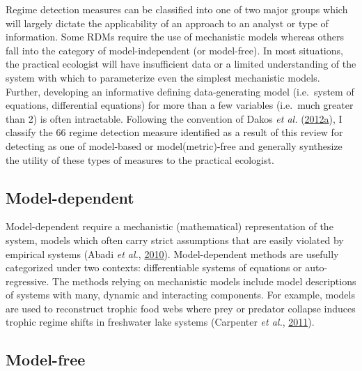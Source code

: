 \documentclass[12pt,twoside,openany]{reedthesis}
\begin{document}
Regime detection measures can be classified into one of two major groups which will largely dictate the applicability of an approach to an analyst or type of information. Some RDMs require the use of mechanistic models whereas others fall into the category of model-independent (or model-free). In most situations, the practical ecologist will have insufficient data or a limited understanding of the system with which to parameterize even the simplest mechanistic models. Further, developing an informative defining data-generating model (i.e.~system of equations, differential equations) for more than a few variables (i.e.~much greater than 2) is often intractable. Following the convention of Dakos \emph{et al.} (\protect\hyperlink{ref-dakos2012methods}{2012}\protect\hyperlink{ref-dakos2012methods}{a}), I classify the 66 regime detection measure identified as a result of this review for detecting as one of model-based or model(metric)-free and generally synthesize the utility of these types of measures to the practical ecologist.

\hypertarget{model-dependent}{%
\subsection{Model-dependent}\label{model-dependent}}

Model-dependent require a mechanistic (mathematical) representation of the system, models which often carry strict assumptions that are easily violated by empirical systems (Abadi \emph{et al.}, \protect\hyperlink{ref-abadi2010assessment}{2010}). Model-dependent methods are usefully categorized under two contexts: differentiable systems of equations or auto-regressive. The methods relying on mechanistic models include model descriptions of systems with many, dynamic and interacting components. For example, models are used to reconstruct trophic food webs where prey or predator collapse induces trophic regime shifts in freshwater lake systems (Carpenter \emph{et al.}, \protect\hyperlink{ref-carpenter2011early}{2011}).

\hypertarget{model-free}{%
\subsection{Model-free}\label{model-free}}
\end{document}
